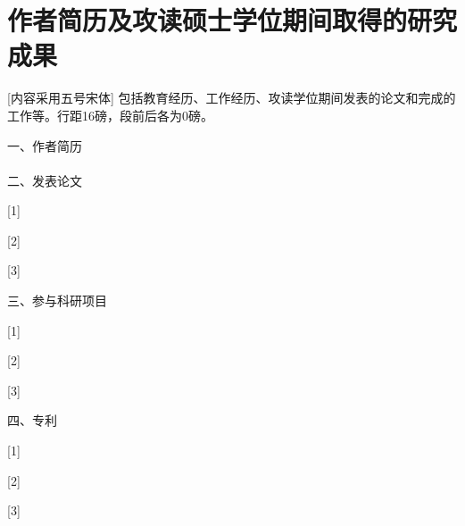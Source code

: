 \setlength{\baselineskip}{16pt}
\chapter{作者简历及攻读硕士学位期间取得的研究成果}

[内容采用五号宋体]  包括教育经历、工作经历、攻读学位期间发表的论文和完成的工作等。行距16磅，段前后各为0磅。

 一、作者简历
~\\

~\\

二、发表论文

\setlength{\hangindent}{3.6em} %
[1] 

\setlength{\hangindent}{3.6em}
[2] 

\setlength{\hangindent}{3.6em}
[3] 

\vspace{10pt}
三、参与科研项目

\setlength{\hangindent}{3.6em}
[1]
	
\setlength{\hangindent}{3.6em}
[2]

\setlength{\hangindent}{3.6em}
[3]

\vspace{10pt}


四、专利

\setlength{\hangindent}{3.6em} %
[1] 

\setlength{\hangindent}{3.6em}
[2] 

\setlength{\hangindent}{3.6em}
[3] 


